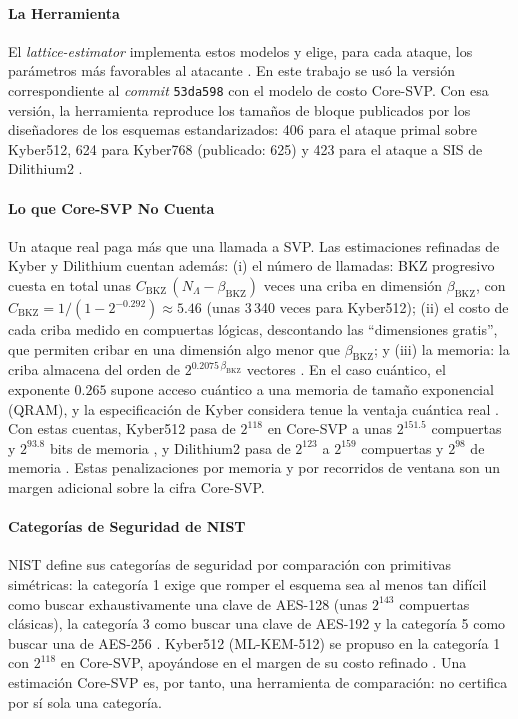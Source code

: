 \paragraph{La Herramienta}
El \textit{lattice-estimator} implementa estos modelos y elige, para cada ataque, los parámetros más favorables al atacante \cite{albrecht2015concrete, latticeestimator}. En este trabajo se usó la versión correspondiente al \textit{commit} \texttt{53da598} con el modelo de costo Core-SVP. Con esa versión, la herramienta reproduce los tamaños de bloque publicados por los diseñadores de los esquemas estandarizados: 406 para el ataque primal sobre Kyber512, 624 para Kyber768 (publicado: 625) y 423 para el ataque a SIS de Dilithium2 \cite{avanzi2021kyber, bai2021dilithium}.

\paragraph{Lo que Core-SVP No Cuenta}
Un ataque real paga más que una llamada a SVP. Las estimaciones refinadas de Kyber y Dilithium cuentan además: (i) el número de llamadas: BKZ progresivo cuesta en total unas $C_{\mathrm{BKZ}}\,(N_\Lambda - \beta_{\mathrm{BKZ}})$ veces una criba en dimensión $\beta_{\mathrm{BKZ}}$, con $C_{\mathrm{BKZ}} = 1/(1 - 2^{-0.292}) \approx 5.46$ (unas 3\,340 veces para Kyber512); (ii) el costo de cada criba medido en compuertas lógicas, descontando las ``dimensiones gratis'', que permiten cribar en una dimensión algo menor que $\beta_{\mathrm{BKZ}}$; y (iii) la memoria: la criba almacena del orden de $2^{0.2075\,\beta_{\mathrm{BKZ}}}$ vectores \cite{avanzi2021kyber}. En el caso cuántico, el exponente $0.265$ supone acceso cuántico a una memoria de tamaño exponencial (QRAM), y la especificación de Kyber considera tenue la ventaja cuántica real \cite{avanzi2021kyber}. Con estas cuentas, Kyber512 pasa de $2^{118}$ en Core-SVP a unas $2^{151.5}$ compuertas y $2^{93.8}$ bits de memoria \cite{avanzi2021kyber}, y Dilithium2 pasa de $2^{123}$ a $2^{159}$ compuertas y $2^{98}$ de memoria \cite{bai2021dilithium}. Estas penalizaciones por memoria y por recorridos de ventana son un margen adicional sobre la cifra Core-SVP.

\paragraph{Categorías de Seguridad de NIST}
NIST define sus categorías de seguridad por comparación con primitivas simétricas: la categoría 1 exige que romper el esquema sea al menos tan difícil como buscar exhaustivamente una clave de AES-128 (unas $2^{143}$ compuertas clásicas), la categoría 3 como buscar una clave de AES-192 y la categoría 5 como buscar una de AES-256 \cite{nist2016call}. Kyber512 (ML-KEM-512) se propuso en la categoría 1 con $2^{118}$ en Core-SVP, apoyándose en el margen de su costo refinado \cite{avanzi2021kyber}. Una estimación Core-SVP es, por tanto, una herramienta de comparación: no certifica por sí sola una categoría.

